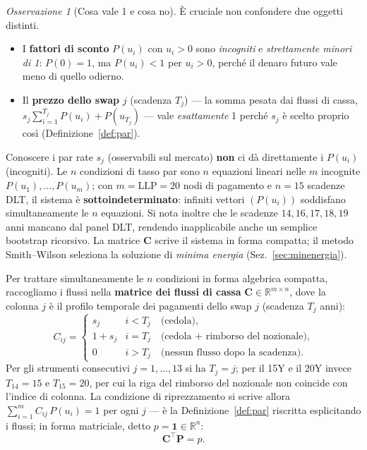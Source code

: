 \documentclass[11pt,a4paper]{article}
\theoremstyle{plain}
\theoremstyle{definition}
\theoremstyle{remark}
\newtheorem*{osservazione}{Osservazione}
\newcommand{\LLP}{\ensuremath{\mathrm{LLP}}}
\newcommand{\transp}{^{\!\top}}
\begin{document}
\begin{osservazione}[Cosa vale 1 e cosa no]
\label{oss:pari}
\`E cruciale non confondere due oggetti distinti.
\begin{itemize}
  \item I \textbf{fattori di sconto} $P(u_i)$ con $u_i > 0$ sono \emph{incogniti} e
        \emph{strettamente minori di 1}: $P(0)=1$, ma $P(u_i) < 1$ per $u_i>0$, perch\'e il
        denaro futuro vale meno di quello odierno.
  \item Il \textbf{prezzo dello swap} $j$ (scadenza $T_j$) --- la somma pesata dai flussi di
        cassa, $s_j\sum_{i=1}^{T_j}P(u_i)+P(u_{T_j})$ --- vale \emph{esattamente} 1
        perch\'e $s_j$ \`e scelto proprio cos\`i (Definizione~\ref{def:par}).
\end{itemize}
Conoscere i par rate $s_j$ (osservabili sul mercato) \textbf{non} ci d\`a direttamente i
$P(u_i)$ (incogniti). Le $n$ condizioni di tasso par sono $n$ equazioni lineari nelle $m$
incognite $P(u_1),\ldots,P(u_m)$; con $m = \LLP = 20$ nodi di pagamento e $n = 15$ scadenze
DLT, il sistema \`e \textbf{sottoindeterminato}: infiniti vettori $(P(u_i))$ soddisfano
simultaneamente le $n$ equazioni. Si nota inoltre che le scadenze $14, 16, 17, 18, 19$ anni
mancano dal panel DLT, rendendo inapplicabile anche un semplice bootstrap ricorsivo. La
matrice $\mathbf{C}$ scrive il sistema in forma compatta; il metodo Smith--Wilson seleziona
la soluzione di \emph{minima energia} (Sez.~\ref{sec:minenergia}).
\end{osservazione}

Per trattare simultaneamente le $n$ condizioni in forma algebrica compatta, raccogliamo i
flussi nella \textbf{matrice dei flussi di cassa} $\mathbf{C}\in\mathbb{R}^{m\times n}$,
dove la colonna $j$ \`e il profilo temporale dei pagamenti dello swap $j$ (scadenza $T_j$ anni):
\[
  C_{ij} =
  \begin{cases}
    s_j     & i < T_j \quad\text{(cedola),}\\
    1 + s_j & i = T_j \quad\text{(cedola + rimborso del nozionale),}\\
    0        & i > T_j \quad\text{(nessun flusso dopo la scadenza).}
  \end{cases}
\]
Per gli strumenti consecutivi $j=1,\ldots,13$ si ha $T_j=j$; per il 15Y e il 20Y invece
$T_{14}=15$ e $T_{15}=20$, per cui la riga del rimborso del nozionale non coincide con
l'indice di colonna.
La condizione di riprezzamento si scrive allora $\sum_{i=1}^{m} C_{ij}\,P(u_i) = 1$ per ogni
$j$ --- \`e la Definizione~\ref{def:par} riscritta esplicitando i flussi; in forma matriciale,
detto $p = \mathbf{1} \in \mathbb{R}^n$:
\[
  \mathbf{C}\transp \mathbf{P} = p .
\]
\end{document}
